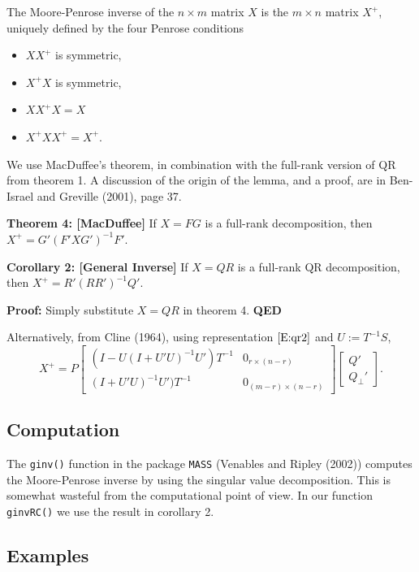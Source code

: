 \documentclass[12pt,]{article}
\providecommand{\tightlist}{%
  \setlength{\itemsep}{0pt}\setlength{\parskip}{0pt}}
\begin{document}
The Moore-Penrose inverse of the \(n\times m\) matrix \(X\) is the
\(m\times n\) matrix \(X^+\), uniquely defined by the four Penrose
conditions

\begin{itemize}
\tightlist
\item
  \(XX^+\) is symmetric,
\item
  \(X^+X\) is symmetric,
\item
  \(XX^+X=X\)
\item
  \(X^+XX^+=X^+\).
\end{itemize}

We use MacDuffee's theorem, in combination with the full-rank version of
QR from theorem 1. A discussion of the origin of the lemma, and a proof,
are in Ben-Israel and Greville (2001), page 37.

\textbf{Theorem 4: {[}MacDuffee{]}} If \(X=FG\) is a full-rank
decomposition, then \(X^+=G'(F'XG')^{-1}F'\).

\textbf{Corollary 2: {[}General Inverse{]}} If \(X=QR\) is a full-rank
QR decomposition, then \(X^+=R'(RR')^{-1}Q'\).

\textbf{Proof:} Simply substitute \(X=QR\) in theorem 4. \textbf{QED}

Alternatively, from Cline (1964), using representation \(\eqref{E:qr2}\)
and \(U:=T^{-1}S\), \[
X^+=
P\begin{bmatrix}(I-U(I+U'U)^{-1}U')T^{-1}&0_{r\times(n-r)}\\(I+U'U)^{-1}U')T^{-1}&0_{(m-r)\times(n-r)}\end{bmatrix}\begin{bmatrix}Q'\\Q_\perp'\end{bmatrix}.
\]

\subsection{Computation}\label{computation-3}

The \texttt{ginv()} function in the package \texttt{MASS} (Venables and
Ripley (2002)) computes the Moore-Penrose inverse by using the singular
value decomposition. This is somewhat wasteful from the computational
point of view. In our function \texttt{ginvRC()} we use the result in
corollary 2.

\subsection{Examples}\label{examples-3}
\end{document}
